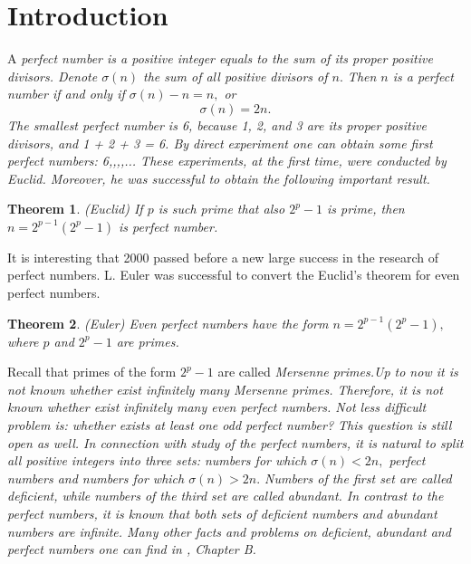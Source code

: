 \documentclass[12pt]{amsart}
\newtheorem{theorem}{Theorem}
\numberwithin{equation}{section}
\begin{document}
\section{Introduction }
 A \slshape perfect number \upshape is a positive integer equals to the sum of its proper positive divisors. Denote $\sigma(n)$ the sum of all positive divisors of $n.$ Then $n$ is a perfect number if and only if $\sigma(n)-n=n,$ or
\begin{equation}\label{1.1}
\sigma(n)=2n.
\end{equation}
The smallest perfect number is 6, because 1, 2, and 3 are its proper positive divisors, and 1 + 2 + 3 = 6.
By direct experiment one can obtain some first perfect numbers: 6,,,,... These experiments, at the first time, were conducted by Euclid. Moreover, he was successful to obtain the following important result.
\begin{theorem} \label{t1}(Euclid)
If $p$ is such prime that also $2^p-1$ is prime, then $n=2^{p-1}(2^p-1)$ is perfect number.
\end{theorem}
It is interesting that 2000 passed before a new large success in the research of perfect numbers. L. Euler was successful to convert the Euclid's theorem for even perfect numbers.
\begin{theorem} \label{t2}(Euler)
Even perfect numbers have the form $n=2^{p-1}(2^p-1),$ where $p$ and $2^p-1$ are primes.
\end{theorem}
\indent Recall that primes of the form $2^p-1$ are called \slshape Mersenne primes.\upshape Up to now it is not known whether exist infinitely many Mersenne primes. Therefore, it is not known whether exist infinitely many even perfect numbers. Not less difficult problem is: whether exists at least one \slshape odd \upshape perfect number? This question is still open as well.\newline
\indent In connection with study of the perfect numbers, it is natural to split all positive integers into three sets: numbers for which $\sigma(n)<2n,$ perfect numbers and numbers for which $\sigma(n)>2n.$ Numbers of the first set are called \slshape deficient, \upshape while numbers of the third set are called \slshape abundant. \upshape \newpage In contrast to the perfect numbers, it is known that both sets of deficient numbers and abundant numbers are infinite. Many other facts and problems on deficient, abundant and perfect numbers one can find in \cite{1}, Chapter B.\newline
\end{document}
